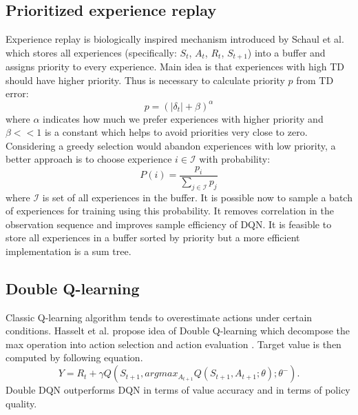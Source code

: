 \subsection{Prioritized experience replay}
Experience replay is biologically inspired mechanism introduced by Schaul et al. \cite{schaul2015} which stores all experiences (specifically: $S_t$, $A_t$, $R_{t}$, $S_{t+1}$) into a buffer and assigns priority to every experience. Main idea is that experiences with high TD should have higher priority. Thus is necessary to calculate priority $p$ from TD error:
\begin{equation}
p = (|\delta_t | + \beta)^\alpha
\end{equation}
where $\alpha$ indicates how much we prefer experiences with higher priority and $\beta << 1$ is a constant which helps to avoid priorities very close to zero. Considering a greedy selection would abandon experiences with low priority, a better approach is to choose experience $i \in \mathcal{I}$ with probability:
\begin{equation}
P(i) = \frac{p_i}{\sum_{j \in \mathcal{I}} p_j}
\end{equation}
where $\mathcal{I}$ is set of all experiences in the buffer. It is possible now to sample a batch of experiences for training using this probability. It removes correlation in the observation sequence and improves sample efficiency of DQN. It is feasible to store all experiences in a buffer sorted by priority but a more efficient implementation is a sum tree.

\subsection{Double Q-learning}
Classic Q-learning algorithm tends to overestimate actions under certain conditions. Hasselt et al. propose idea of Double Q-learning which decompose the max operation into action selection and action evaluation \cite{hasselt2015}. Target value is then computed by following equation.
\begin{equation}
Y = R_{t} + \gamma Q(S_{t+1}, argmax_{A_{t+1}}Q(S_{t+1}, A_{t+1};\theta);\theta^-).
\end{equation}
Double DQN outperforms DQN in terms of value accuracy and in terms of policy quality.

\clearpage
